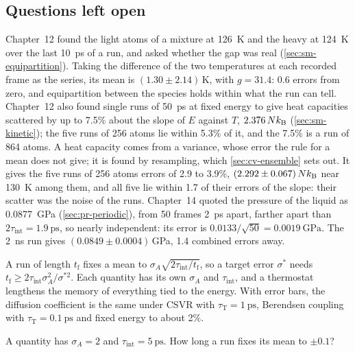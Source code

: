 \subsection*{Questions left open}

Chapter~12 found the light atoms of a mixture at \SI{126}{\kelvin} and
the heavy at \SI{124}{\kelvin} over the last \SI{10}{\pico\second} of a run,
and asked whether the gap was real (\cref{sec:sm-equipartition}). Taking
the difference of the two temperatures at each recorded frame as the
series, its mean is $(1.30 \pm 2.14)$\,\si{\kelvin}, with $g = 31.4$: 0.6
errors from zero, and equipartition between the species holds within what
the run can tell. Chapter~12 also found single runs of \SI{50}{\pico\second}
at fixed energy to give heat capacities scattered by up to 7.5\% about the
slope of $E$ against $T$, $2.376\,Nk_{\mathrm{B}}$ (\cref{sec:sm-kinetic}); the five
runs of 256 atoms lie within 5.3\% of it, and the 7.5\% is a run of 864
atoms. A heat capacity comes from a variance, whose error the rule for a
mean does not give; it is found by resampling, which \cref{sec:cv-ensemble}
sets out. It gives the five runs of 256 atoms errors of 2.9 to 3.9\%,
$(2.292 \pm 0.067)\,Nk_{\mathrm{B}}$ near \SI{130}{\kelvin} among them, and all five
lie within 1.7 of their errors of the slope: their scatter was the noise
of the runs.
Chapter~14 quoted the pressure of the liquid as \SI{0.0877}{\giga\pascal}
(\cref{sec:pr-periodic}), from 50 frames \SI{2}{\pico\second} apart,
farther apart than $2\tau_{\mathrm{int}} = \SI{1.9}{\pico\second}$, so
nearly independent: its error is
$0.0133/\sqrt{50} = \SI{0.0019}{\giga\pascal}$. The \SI{2}{\nano\second}
run gives $(0.0849 \pm 0.0004)$\,\si{\giga\pascal}, 1.4 combined errors
away.

\begin{keyidea}
A run of length $t_{\mathrm f}$ fixes a mean to
$\sigma_A\sqrt{2\tau_{\mathrm{int}}/t_{\mathrm f}}$, so a target error
$\sigma^\ast$ needs $t_{\mathrm f} \ge 2\tau_{\mathrm{int}}
\sigma_A^2/\sigma^{\ast2}$. Each quantity has its own $\sigma_A$ and
$\tau_{\mathrm{int}}$, and a thermostat lengthens the memory of everything
tied to the energy. With error bars, the diffusion coefficient is the same
under CSVR with $\tau_{\mathrm T} = \SI{1}{\pico\second}$, Berendsen
coupling with $\tau_{\mathrm T} = \SI{0.1}{\pico\second}$ and fixed
energy to about 2\%.
\end{keyidea}


\begin{selfcheck}
A quantity has $\sigma_A = 2$ and $\tau_{\mathrm{int}} = \SI{5}{\pico
\second}$. How long a run fixes its mean to $\pm0.1$?
\end{selfcheck}
